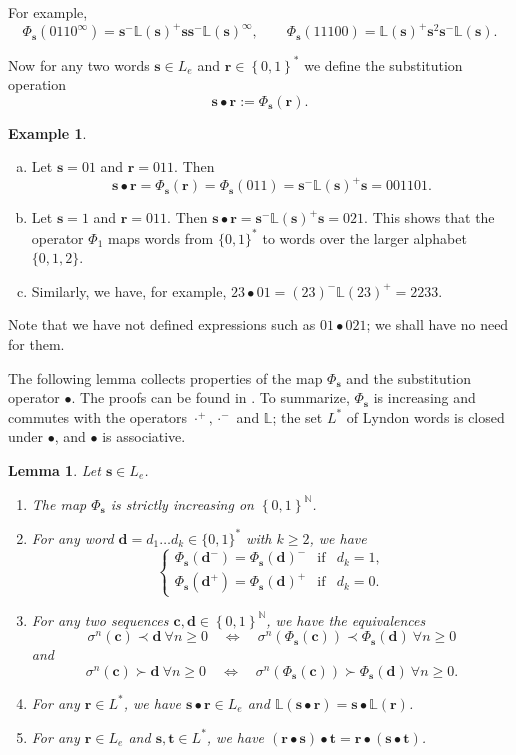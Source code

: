 \documentclass[11pt]{amsart}
\newtheorem{lemma}[theorem]{Lemma}
\theoremstyle{definition}
\newtheorem{example}[theorem]{Example}
\theoremstyle{remark}
\numberwithin{equation}{section}
\newcommand{\N}{\ensuremath{\mathbb{N}}}
\renewcommand{\L}{\ensuremath{\mathbb{L}}}
\newcommand{\LL}{L^*}
\renewcommand{\c}{ {\mathbf{c}}}
\renewcommand{\d}{ {\mathbf{d}}}
\renewcommand{\t}{ {\mathbf{t}}}
\newcommand{\s}{ {\mathbf{s}}}
\renewcommand{\r}{ {\mathbf{r}}}
\newcommand{\set}[1]{\left\{#1\right\}}
\newcommand{\f}{\infty}
\newcommand{\si}{\sigma}
\begin{document}
For example,
\[
\Phi_\s(0110^\f)=\s^-\L(\s)^+\s\s^-\L(\s)^\f, \qquad \Phi_\s(11100)=\L(\s)^+\s^2\s^-\L(\s).
\]

Now for any two words $\s\in L_e$ and $\r\in\set{0,1}^*$ we define the substitution operation
\begin{equation} \label{eq:substitution}
\s\bullet\r:=\Phi_\s(\r).
\end{equation}

\begin{example} \label{ex:1}
\begin{enumerate}[(a)]
\item Let $\s=01$ and $\r=011$. Then
  \[
   \s\bullet\r=\Phi_\s(\r)=\Phi_\s(011)={\s^-}\L(\s)^+\s=001101.
	\]
\item Let $\s=1$ and $\r=011$. Then $\s\bullet\r={\s^-}\L(\s)^+\s=021$. This shows that the operator $\Phi_1$ maps words from $\{0,1\}^*$ to words over the larger alphabet $\{0,1,2\}$. 
\item Similarly, we have, for example, $23\bullet 01=(23)^-\L(23)^+=2233$.
\end{enumerate}
\end{example}

Note that we have not defined expressions such as $01\bullet 021$; we shall have no need for them.

The following lemma collects properties of the map $\Phi_\s$ and the substitution operator $\bullet$. The proofs can be found in \cite[Section 3]{Allaart-Kong-2021}. To summarize, $\Phi_\s$ is increasing and commutes with the operators $\cdot^+,\cdot^-$ and $\L$; the set $\LL$ of Lyndon words is closed under $\bullet$, and $\bullet$ is associative.

\begin{lemma} \label{lem:substitution-properties}
Let $\s\in {L_e}$.
\begin{enumerate}[{\rm(i)}]
\item The map $\Phi_\s$ is strictly increasing on $\set{0,1}^\N$.
\item For any  word $\d=d_1\ldots d_k\in \{0,1\}^*$ with $k\ge 2$, we have
\[
\left\{
\begin{array}{lll}
\Phi_\s(\d^-)=\Phi_\s(\d)^-&\textrm{if}& d_k=1,\\
\Phi_\s(\d^+)=\Phi_\s(\d)^+&\textrm{if}& d_k=0.
\end{array}\right.
\]
\item For any two sequences $\c,\d\in\set{0,1}^\N$, we have the {equivalences}
\[
\si^n(\c)\prec \d~\forall n\ge 0\quad{\Longleftrightarrow}\quad \si^n(\Phi_\s(\c))\prec \Phi_\s(\d)~\forall n\ge 0
\]
and
\[
\si^n(\c)\succ \d~\forall n\ge 0\quad{\Longleftrightarrow}\quad \si^n(\Phi_\s(\c))\succ \Phi_\s(\d)~\forall n\ge 0.
\]
\item For any $\r\in L^*$, we have $\s\bullet\r\in {L_e}$ and $\L(\s\bullet\r)=\s\bullet\L(\r)$.
\item For any {$\r\in L_e$ and $\s,\t\in L^*$, we have $(\r\bullet\s)\bullet\t=\r\bullet(\s\bullet\t)$.}
\end{enumerate}
\end{lemma}
\end{document}
